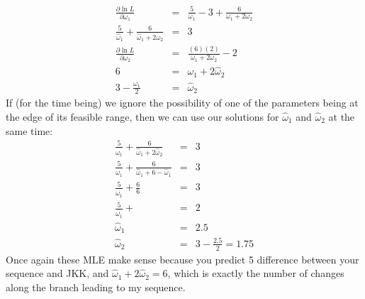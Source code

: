 \documentclass[11pt]{article}
\begin{document}
\begin{eqnarray}
\frac{\partial\ln L}{\partial \omega_1} & = &
    \frac{5}{\omega_1} -3  + \frac{6}{\omega_1+2\omega_2} \\
\frac{5}{\hat{\omega}_1}  + \frac{6}{\hat{\omega}_1+2\omega_2} & = & 3 \\
\frac{\partial\ln L}{\partial \omega_2} & = &
    \frac{(6)(2)}{\omega_1+2\omega_2} - 2 \\
    6 & = & \omega_1+2\hat{\omega}_2 \\
    3 - \frac{\omega_1}{2} & = & \hat{\omega}_2 
\end{eqnarray}
If (for the time being) we ignore the possibility 
of one of the parameters being at the edge of its feasible range, then
    we can use our solutions for $\hat{\omega}_1$ and
    $\hat{\omega}_2$ at the same time:
\begin{eqnarray}
\frac{5}{\hat{\omega}_1}  + \frac{6}{\hat{\omega}_1+2\hat{\omega}_2} & = & 3 \\
\frac{5}{\hat{\omega}_1}  + \frac{6}{\hat{\omega}_1+6 - \hat{\omega}_1} & = & 3 \\
\frac{5}{\hat{\omega}_1}  + \frac{6}{6} & = & 3 \\
\frac{5}{\hat{\omega}_1}  +  & = & 2 \\
\hat{\omega}_1 & = & 2.5 \\
\hat{\omega}_2 & = & 3 - \frac{2.5}{2} = 1.75 
\end{eqnarray}
Once again these MLE make sense because you predict 5 difference between your sequence and JKK, and
 $\hat{\omega}_1 + 2\hat{\omega}_2 = 6$, which is exactly the number of changes along the branch
leading to my sequence.
\end{document}
